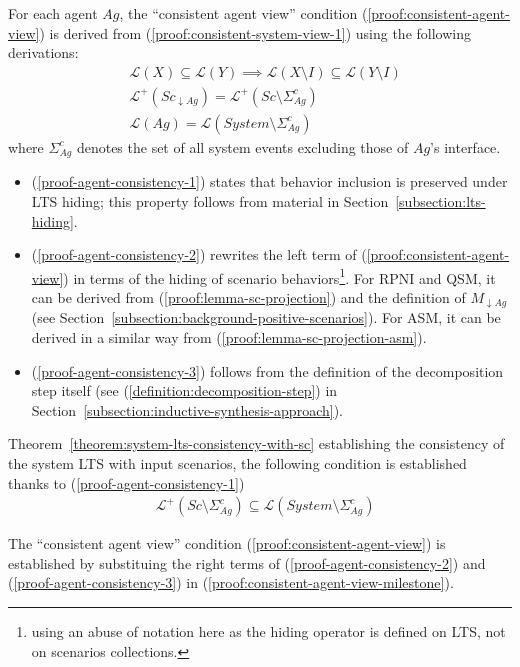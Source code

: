 For each agent $Ag$, the ``consistent agent view'' condition (\ref{proof:consistent-agent-view}) is derived from (\ref{proof:consistent-system-view-1}) using the following derivations:
\begin{align}
&\mathcal{L}(X) \subseteq \mathcal{L}(Y) \implies \mathcal{L}(X \setminus I) \subseteq \mathcal{L}(Y \setminus I) \label{proof-agent-consistency-1}\\
&\mathcal{L}^+(Sc_{\downarrow Ag}) = \mathcal{L}^+(Sc \setminus \Sigma_{Ag}^c)\label{proof-agent-consistency-2}\\
&\mathcal{L}(Ag) = \mathcal{L}(System \setminus \Sigma_{Ag}^c)\label{proof-agent-consistency-3}
\end{align}
where $\Sigma_{Ag}^c$ denotes the set of all system events excluding those of $Ag$'s interface.
\begin{itemize}
\item (\ref{proof-agent-consistency-1}) states that behavior inclusion is preserved under LTS hiding; this property follows from material in Section~\ref{subsection:lts-hiding}. 
\item (\ref{proof-agent-consistency-2}) rewrites the left term of (\ref{proof:consistent-agent-view}) in terms of the hiding of scenario behaviors\footnote{using an abuse of notation here as the hiding operator is defined on LTS, not on scenarios collections.}. For RPNI and QSM, it can be derived from (\ref{proof:lemma-sc-projection}) and the definition of $M_{\downarrow Ag}$ (see Section~\ref{subsection:background-positive-scenarios}). For ASM, it can be derived in a similar way from (\ref{proof:lemma-sc-projection-asm}).
\item (\ref{proof-agent-consistency-3}) follows from the definition of the decomposition step itself (see (\ref{definition:decomposition-step}) in Section~\ref{subsection:inductive-synthesis-approach}). 
\end{itemize}

Theorem~\ref{theorem:system-lts-consistency-with-sc} establishing the consistency of the system LTS with input scenarios, the following condition is established thanks to (\ref{proof-agent-consistency-1})
\begin{align}
&\mathcal{L}^+(Sc \setminus \Sigma_{Ag}^c) \subseteq \mathcal{L}(System \setminus \Sigma_{Ag}^c)\label{proof:consistent-agent-view-milestone}
\end{align}

The ``consistent agent view'' condition (\ref{proof:consistent-agent-view}) is established by substituing the right terms of (\ref{proof-agent-consistency-2}) and (\ref{proof-agent-consistency-3}) in (\ref{proof:consistent-agent-view-milestone}).

